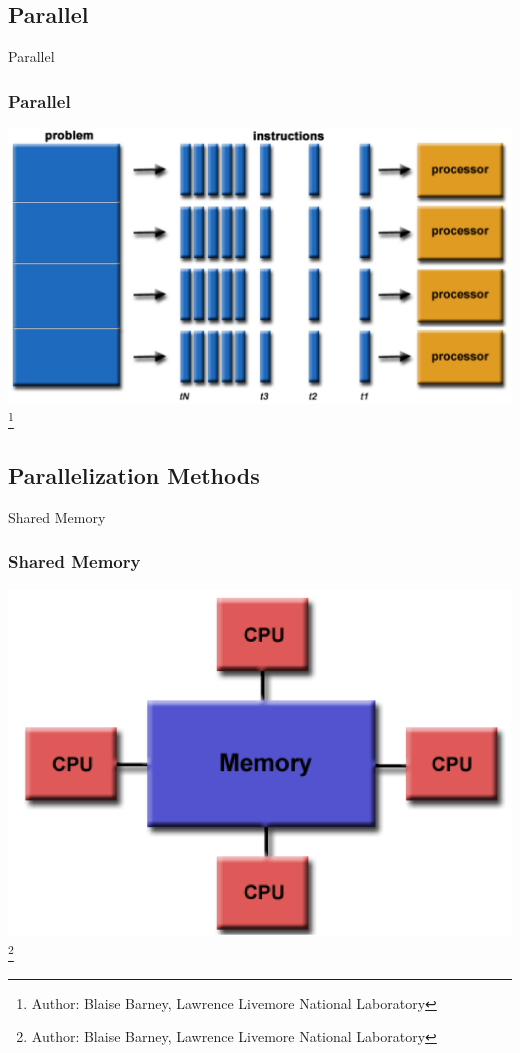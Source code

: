 \documentclass[hyperref={pdfpagelabels=false}]{beamer}
\newcommand\blfootnote[1]{%
   \begingroup
   \renewcommand\thefootnote{}\footnote{#1}%
   \addtocounter{footnote}{-1}%
   \endgroup
}
\begin{document}
    \subsection{Parallel}
    \begin{frame}{Parallel}
        \frametitle{Parallel}
        \begin{center}
            \includegraphics[scale=0.4]{images/parallel.png}
            \blfootnote{\tiny{Author: Blaise Barney, Lawrence Livemore National Laboratory}}
        \end{center}
    \end{frame}
    
    \subsection{Parallelization Methods}
    \begin{frame}{Shared Memory}
        \frametitle{Shared Memory}
        \begin{center}
            \includegraphics[scale=0.4]{images/shared_memory.png}
            \blfootnote{\tiny{Author: Blaise Barney, Lawrence Livemore National Laboratory}}
        \end{center}
    \end{frame}
    
\end{document}
